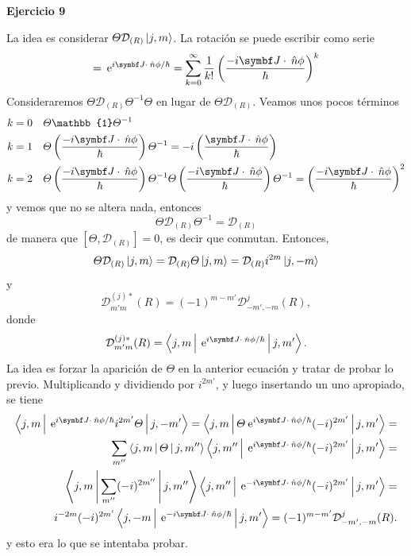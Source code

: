 \documentclass[10pt,oneside]{CBFT_book}
\begin{document}
\begin{ejemplo}{\bf Ejercicio 9}

La idea es considerar $\Theta \mathcal{D}_{(R)} \Ket{j,m}$. La rotación se puede escribir como serie
\[
	= \euler^{ i \vb J \cdot \nver \phi / \hbar } = 
	\sum_{k=0}^\infty \frac{1}{k!} \Frac{-i \vb J \cdot \nver \phi}{\hbar}^k
\]
Consideraremos $\Theta \mathcal{D}_{(R)} \Theta^{-1} \Theta $ en lugar de $ \Theta \mathcal{D}_{(R)}$.
Veamos unos pocos términos
\begin{eqnarray*}
 k=0 \quad	& \Theta \mathbb{1} \Theta^{-1} \\
 k=1 \quad	& \Theta \Frac{-i \vb J \cdot \nver \phi}{\hbar} \Theta^{-1} = - i \Frac{\vb J \cdot \nver \phi}{\hbar} \\
 k=2 \quad	& \Theta \Frac{-i \vb J \cdot \nver \phi}{\hbar} \Theta^{-1} \Theta \Frac{-i \vb J \cdot \nver \phi}{\hbar} \Theta^{-1} =
 \Frac{-i \vb J \cdot \nver \phi}{\hbar}^2
\end{eqnarray*}
y vemos que no se altera nada, entonces
\[
	\Theta \mathcal{D}_{(R)} \Theta^{-1} = \mathcal{D}_{(R)}
\]
de manera que $ [\Theta, \mathcal{D}_{(R)} ] = 0 $, es decir que conmutan.
Entonces,
\[
	\Theta \mathcal{D}_{(R)} \Ket{j,m} = \mathcal{D}_{(R)} \Theta \Ket{j,m} = 
	\mathcal{D}_{(R)} i^{2m} \Ket{j,-m}
\]
y
\[
	\mathcal{D}_{m' m}^{(j)*}(R) = (-1)^{m-m'} \mathcal{D}_{-m', -m}^{j}(R),
\]
donde 
\[
	\mathcal{D}_{m' m}^{(j)*}(R) = \Braket{ j, m | \euler^{ i \vb J \cdot \nver \phi / \hbar } | j, m' }.
\]
La idea es forzar la aparición de $\Theta$ en la anterior ecuación y tratar de probar lo previo.
Multiplicando y dividiendo por $i^{2m'}$, y luego insertando un uno apropiado, se tiene
\[
\begin{aligned}
	\Braket{ j, m | \euler^{ i \vb J \cdot \nver \phi / \hbar } i^{2m'} \Theta | j, -m' } =
	\Braket{ j, m | \Theta \euler^{ i \vb J \cdot \nver \phi / \hbar } (-i)^{2m'} | j, m' } = \\
	\sum_{m''}\Braket{ j, m | \Theta | j, m'' }
	\Braket{ j, m'' | \euler^{ i \vb J \cdot \nver \phi / \hbar } (-i)^{2m'} | j, m' } = \\
	\Braket{ j, m | \sum_{m''} (-i)^{2m''} | j, m'' }
	\Braket{ j, m'' | \euler^{ -i \vb J \cdot \nver \phi / \hbar } (-i)^{2m'} | j, m' } = \\
	i^{-2m} (-i)^{2m'} \Braket{ j, -m | \euler^{ -i \vb J \cdot \nver \phi / \hbar }  | j, m' } =
	(-1)^{m-m'} \mathcal{D}_{-m', -m}^{j}(R).
\end{aligned}
\]
y esto era lo que se intentaba probar.
 
\end{ejemplo}
\end{document}
